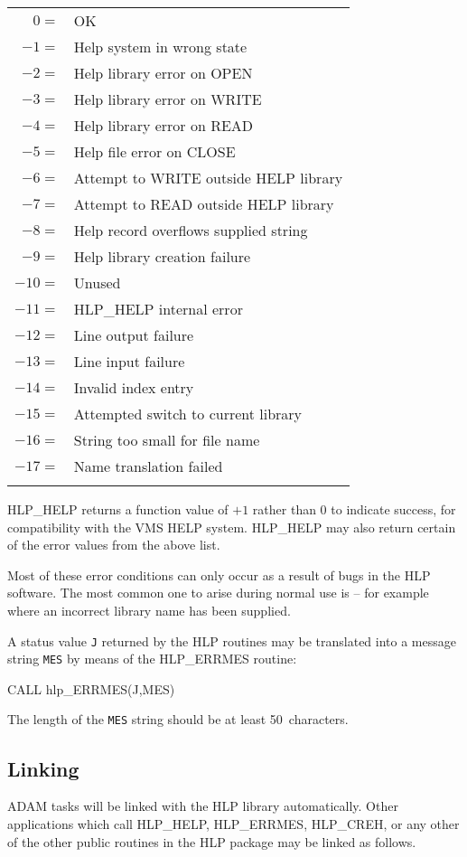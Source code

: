 \documentclass[11pt,nolof]{starlink}
\providecommand{\qt}[1]{``{\tt{#1}}''}
\providecommand{\fstring}[1]{\hbox{\hspace{0.05em}{\qt{#1}}\hspace{0.05em}}}
\begin{document}
\begin{tabular}{rl}
\\
   $0=$ & OK \\
  $-1=$ & Help system in wrong state \\
  $-2=$ & Help library error on OPEN \\
  $-3=$ & Help library error on WRITE \\
  $-4=$ & Help library error on READ \\
  $-5=$ & Help file error on CLOSE \\
  $-6=$ & Attempt to WRITE outside HELP library \\
  $-7=$ & Attempt to READ outside HELP library \\
  $-8=$ & Help record overflows supplied string \\
  $-9=$ & Help library creation failure \\
 $-10=$ & Unused \\
 $-11=$ & HLP\_HELP internal error \\
 $-12=$ & Line output failure \\
 $-13=$ & Line input failure \\
 $-14=$ & Invalid index entry \\
 $-15=$ & Attempted switch to current library \\
 $-16=$ & String too small for file name \\
 $-17=$ & Name translation failed \\ \\
\end{tabular}

HLP\_HELP returns a function value of $+1$ rather than 0 to indicate
success, for compatibility with the VMS HELP system.  HLP\_HELP may also
return certain of the error values from the above list.

Most of these error conditions can only occur as a result of
bugs in the HLP software.  The most common one to arise during
normal use is \fstring{HELP library error on OPEN} -- for example where
an incorrect library name has been supplied.

A status value \texttt{J} returned by the HLP routines may be translated
into a message string \texttt{MES} by means of the HLP\_ERRMES routine:
\begin{terminalv}
CALL hlp_ERRMES(J,MES)
\end{terminalv}
The length of the \texttt{MES} string should be at least 50~characters.

\subsection{Linking}
ADAM tasks will be linked with the HLP library automatically.
Other applications which call HLP\_HELP, HLP\_ERRMES, HLP\_CREH,
or any other of the other public
routines in the HLP package may be linked as follows.
\end{document}
